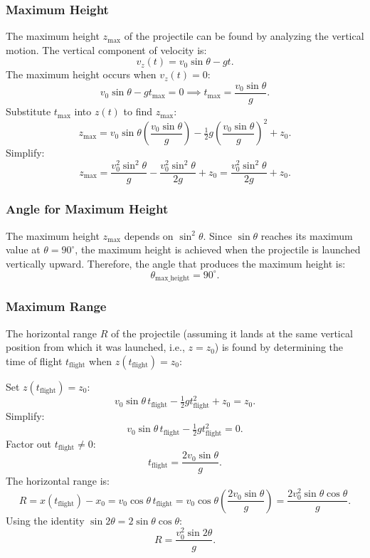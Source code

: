 \subsubsection*{Maximum Height}

\noindent The maximum height \( z_{\text{max}} \) of the projectile can be found by analyzing the vertical motion. The vertical component of velocity is:
\[
v_z(t) = v_0 \sin \theta - gt.
\]
\noindent The maximum height occurs when \( v_z(t) = 0 \):
\[
v_0 \sin \theta - gt_{\text{max}} = 0 \implies t_{\text{max}} = \frac{v_0 \sin \theta}{g}.
\]
\noindent Substitute \( t_{\text{max}} \) into \( z(t) \) to find \( z_{\text{max}} \):
\[
z_{\text{max}} = v_0 \sin \theta \left( \frac{v_0 \sin \theta}{g} \right) - \tfrac{1}{2} g \left( \frac{v_0 \sin \theta}{g} \right)^2 + z_0.
\]
\noindent Simplify:
\[
z_{\text{max}} = \frac{v_0^2 \sin^2 \theta}{g} - \frac{v_0^2 \sin^2 \theta}{2g} + z_0 = \frac{v_0^2 \sin^2 \theta}{2g} + z_0.
\]
\subsubsection*{Angle for Maximum Height}

\noindent The maximum height \( z_{\text{max}} \) depends on \( \sin^2 \theta \). Since \( \sin \theta \) reaches its maximum value at \( \theta = 90^\circ \), the maximum height is achieved when the projectile is launched vertically upward. Therefore, the angle that produces the maximum height is:
\[
\theta_{\text{max\_height}} = 90^\circ.
\]

\subsubsection*{Maximum Range}

\noindent The horizontal range \( R \) of the projectile (assuming it lands at the same vertical position from which it was launched, i.e., \( z = z_0 \)) is found by determining the time of flight \( t_{\text{flight}} \) when \( z(t_{\text{flight}}) = z_0 \):

\noindent Set \( z(t_{\text{flight}}) = z_0 \):
\[
v_0 \sin \theta \, t_{\text{flight}} - \tfrac{1}{2} g t_{\text{flight}}^2 + z_0 = z_0.
\]
\noindent Simplify:
\[
v_0 \sin \theta \, t_{\text{flight}} - \tfrac{1}{2} g t_{\text{flight}}^2 = 0.
\]
\noindent Factor out \( t_{\text{flight}} \neq 0 \):
\[
t_{\text{flight}} = \frac{2 v_0 \sin \theta}{g}.
\]
\noindent The horizontal range is:
\[
R = x(t_{\text{flight}}) - x_0 = v_0 \cos \theta \, t_{\text{flight}} = v_0 \cos \theta \left( \frac{2 v_0 \sin \theta}{g} \right) = \frac{2 v_0^2 \sin \theta \cos \theta}{g}.
\]
\noindent Using the identity \( \sin 2\theta = 2 \sin \theta \cos \theta \):
\[
R = \frac{v_0^2 \sin 2\theta}{g}.
\]


